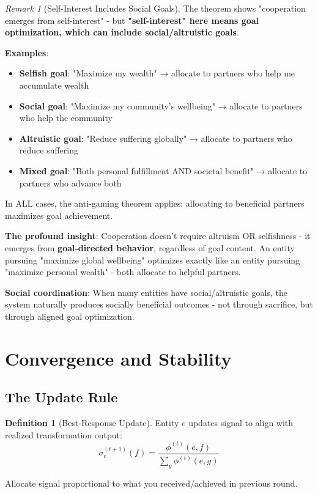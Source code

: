 \documentclass[11pt,a4paper]{article}
\theoremstyle{definition}
\newtheorem{definition}[theorem]{Definition}
\theoremstyle{remark}
\newtheorem{remark}[theorem]{Remark}
\begin{document}
\begin{remark}[Self-Interest Includes Social Goals]
The theorem shows "cooperation emerges from self-interest" - but \textbf{"self-interest" here means goal optimization, which can include social/altruistic goals}.

\textbf{Examples}:
\begin{itemize}
\item \textbf{Selfish goal}: "Maximize my wealth" → allocate to partners who help me accumulate wealth
\item \textbf{Social goal}: "Maximize my community's wellbeing" → allocate to partners who help the community
\item \textbf{Altruistic goal}: "Reduce suffering globally" → allocate to partners who reduce suffering
\item \textbf{Mixed goal}: "Both personal fulfillment AND societal benefit" → allocate to partners who advance both
\end{itemize}

In ALL cases, the anti-gaming theorem applies: allocating to beneficial partners maximizes goal achievement.

\textbf{The profound insight}: Cooperation doesn't require altruism OR selfishness - it emerges from \textbf{goal-directed behavior}, regardless of goal content. An entity pursuing "maximize global wellbeing" optimizes exactly like an entity pursuing "maximize personal wealth" - both allocate to helpful partners.

\textbf{Social coordination}: When many entities have social/altruistic goals, the system naturally produces socially beneficial outcomes - not through sacrifice, but through aligned goal optimization.
\end{remark}

\section{Convergence and Stability}

\subsection{The Update Rule}

\begin{definition}[Best-Response Update]
Entity $e$ updates signal to align with realized transformation output:
\[ \sigma_e^{(t+1)}(f) = \frac{\phi^{(t)}(e,f)}{\sum_g \phi^{(t)}(e,g)} \]

Allocate signal proportional to what you received/achieved in previous round.
\end{definition}
\end{document}
